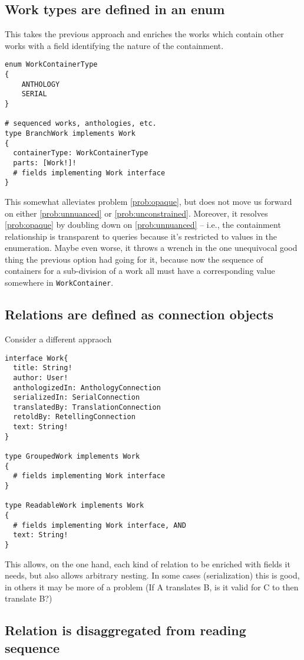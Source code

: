 \documentclass{amsart}
\theoremstyle{remark}
\begin{document}
\subsection{Work types are defined in an enum}
This takes the previous approach and enriches the works which contain other works with a field identifying the nature of the containment.
\begin{lstlisting}[frame=single,basicstyle=\small]
enum WorkContainerType
{
    ANTHOLOGY
    SERIAL
}

# sequenced works, anthologies, etc.
type BranchWork implements Work
{
  containerType: WorkContainerType
  parts: [Work!]!   
  # fields implementing Work interface
}
\end{lstlisting}
This somewhat alleviates problem \ref{prob:opaque}, but does not move us forward on either \ref{prob:unnuanced} or \ref{prob:unconstrained}. Moreover, it resolves \ref{prob:opaque} by doubling down on \ref{prob:unnuanced} -- i.e., the containment relationship is transparent to queries because it's restricted to values in the enumeration. Maybe even worse, it throws a wrench in the one unequivocal good thing the previous option had going for it, because now the sequence of containers for a sub-division of a work all must have a corresponding value somewhere in \lstinline|WorkContainer|. 

\subsection{Relations are defined as connection objects}
Consider a different appraoch
\begin{lstlisting}[frame=single,basicstyle=\small]
interface Work{
  title: String!
  author: User!
  anthologizedIn: AnthologyConnection
  serializedIn: SerialConnection
  translatedBy: TranslationConnection
  retoldBy: RetellingConnection
  text: String!
}

type GroupedWork implements Work
{
  # fields implementing Work interface
}

type ReadableWork implements Work
{
  # fields implementing Work interface, AND
  text: String!
}
\end{lstlisting}

This allows, on the one hand, each kind of relation to be enriched with fields it needs, but also allows arbitrary nesting. In some cases (serialization) this is good, in others it may be more of a problem (If A translates B, is it valid for C to then translate B?) 

\subsection{Relation is disaggregated from reading sequence}
\end{document}

